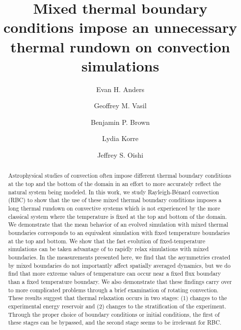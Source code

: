 \documentclass[aps, pre, onecolumn, nofootinbib, notitlepage, groupedaddress, amsfonts, amssymb, amsmath, longbibliography]{revtex4-1}
\newcommand{\RB}{Rayleigh-B\'{e}nard }
\begin{document}
\author{Evan H. Anders}
\author{Geoffrey M. Vasil}
\author{Benjamin P. Brown}
\author{Lydia Korre}
\author{Jeffrey S. Oishi}

\title{Mixed thermal boundary conditions impose an unnecessary thermal rundown on convection simulations}

\begin{abstract}
Astrophysical studies of convection often impose different thermal boundary conditions at the top and the bottom of the domain in an effort to more accurately reflect the natural system being modeled.
In this work, we study \RB convection (RBC) to show that the use of these mixed thermal boundary conditions imposes a long thermal rundown on convective systems which is not experienced by the more classical system where the temperature is fixed at the top and bottom of the domain.
We demonstrate that the mean behavior of an evolved simulation with mixed thermal boundaries corresponds to an equivalent simulation with fixed temperature boundaries at the top and bottom.
We show that the fast evolution of fixed-temperature simulations can be taken advantage of to rapidly relax simulations with mixed boundaries.
In the measurements presented here, we find that the asymmetries created by mixed boundaries do not importantly affect spatially averaged dynamics, but we do find that more extreme values of temperature can occur near a fixed flux boundary than a fixed temperature boundary.
We also demonstrate that these findings carry over to more complicated problems through a brief examination of rotating convection.
These results suggest that thermal relaxation occurs in two stages: (1) changes to the experimental energy reservoir and (2) changes to the stratification of the experiment.
Through the proper choice of boundary conditions or initial conditions, the first of these stages can be bypassed, and the second stage seems to be irrelevant for RBC.
\end{abstract}
\maketitle
\end{document}
